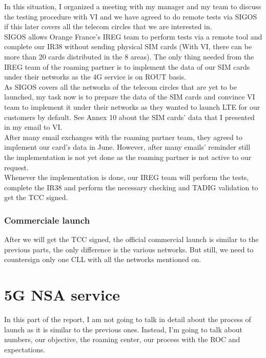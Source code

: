 In this situation, I organized a meeting with my manager and my team to discuss the testing procedure with VI and we have agreed to do remote tests via SIGOS if this later covers all the telecom circles that we are interested in. \\

SIGOS allows Orange France’s \acs{IREG} team to perform tests via a remote tool and complete our IR38 without sending physical \acs{SIM} cards (With VI, there can be more than 20 cards distributed in the 8 areas). The only thing needed from the \acs{IREG} team of the roaming partner is to implement the data of our \acs{SIM} cards under their networks as the \acs{4G} service is on \acs{ROUT} basis.\\

As SIGOS covers all the networks of the telecom circles that are yet to be launched, my task now is to prepare the data of the \acs{SIM} cards and convince VI team to implement it under their networks as they wanted to launch \acs{LTE} for our customers by default. See Annex 10 about the \acs{SIM} cards’ data that I presented in my email to VI.\\

After many email exchanges with the roaming partner team, they agreed to implement our card’s data in June. However, after many emails’ reminder still the implementation is not yet done as the roaming partner is not active to our request.\\

Whenever the implementation is done, our \acs{IREG} team will perform the tests, complete the IR38 and perform the necessary checking and \acs{TADIG} validation to get the \acs{TCC} signed. \\

\subsubsection{Commerciale launch}
\-\hspace{0.5cm} After we will get the \acs{TCC} signed, the official commercial launch is similar to the previous parts, the only difference is the various networks. But still, we need to countersign only one \acs{CLL} with all the networks mentioned on.\\

\section{\acs{5G} \acs{NSA} service}
\-\hspace{0.5cm} In this part of the report, I am not going to talk in detail about the process of launch as it is similar to the previous ones. Instead, I’m going to talk about numbers, our objective, the roaming center, our process with the \acs{ROC} and expectations.\\

